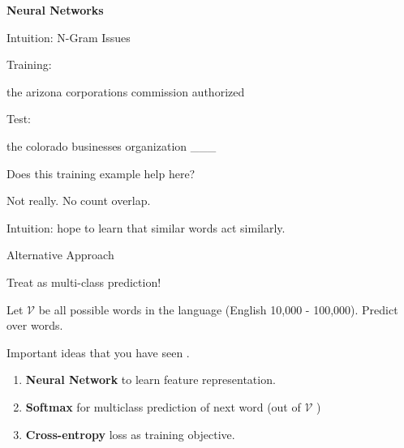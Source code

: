 \documentclass{beamer}
\let\tempone\itemize
\let\temptwo\enditemize
\renewenvironment{itemize}{\tempone\addtolength{\itemsep}{0.5\baselineskip}}{\temptwo}
\newcommand{\air}{\vspace{0.25cm}}
\newcommand{\mcV}{\mathcal{V}}
\begin{document}
\begin{frame}
  \begin{center}
    \textbf{Neural Networks}
  \end{center}
\end{frame}

\begin{frame}{Intuition: N-Gram Issues}
  
  Training: 

  \begin{center}
    the arizona corporations commission \alert{authorized}
  \end{center}

  Test: 
  \begin{center}
    the colorado businesses organization \alert{\_\_\_}
  \end{center}
  \pause 
  
  \begin{itemize}
  \item Does this training example help here?
    \begin{itemize}
    \item Not really. No count overlap.
    \end{itemize}
    \air 
    \pause 
  \item Intuition: hope to learn that similar words act similarly. 
  \end{itemize}
\end{frame}


\begin{frame}{Alternative Approach}

  Treat as multi-class prediction!

  \air

  Let $\mcV$ be all possible words in the language (English 10,000 - 100,000). 
  Predict over words.

\air

 Important ideas that you have seen .

  \begin{enumerate}


  \item \textbf{Neural Network} to learn feature representation. 
  \item \textbf{Softmax} for multiclass prediction of next word (out of $\mcV$ )
  \item \textbf{Cross-entropy} loss as training objective.
  \end{enumerate}
\end{frame}
\end{document}
